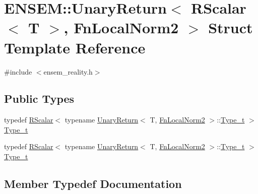 \hypertarget{structENSEM_1_1UnaryReturn_3_01RScalar_3_01T_01_4_00_01FnLocalNorm2_01_4}{}\section{E\+N\+S\+EM\+:\+:Unary\+Return$<$ R\+Scalar$<$ T $>$, Fn\+Local\+Norm2 $>$ Struct Template Reference}
\label{structENSEM_1_1UnaryReturn_3_01RScalar_3_01T_01_4_00_01FnLocalNorm2_01_4}


{\ttfamily \#include $<$ensem\+\_\+reality.\+h$>$}

\subsection*{Public Types}
\begin{DoxyCompactItemize}
\item 
typedef \mbox{\hyperlink{classENSEM_1_1RScalar}{R\+Scalar}}$<$ typename \mbox{\hyperlink{structENSEM_1_1UnaryReturn}{Unary\+Return}}$<$ T, \mbox{\hyperlink{structENSEM_1_1FnLocalNorm2}{Fn\+Local\+Norm2}} $>$\+::\mbox{\hyperlink{structENSEM_1_1UnaryReturn_3_01RScalar_3_01T_01_4_00_01FnLocalNorm2_01_4_ab989f2d45f35f7fcfa14b6b5f12d66f4}{Type\+\_\+t}} $>$ \mbox{\hyperlink{structENSEM_1_1UnaryReturn_3_01RScalar_3_01T_01_4_00_01FnLocalNorm2_01_4_ab989f2d45f35f7fcfa14b6b5f12d66f4}{Type\+\_\+t}}
\item 
typedef \mbox{\hyperlink{classENSEM_1_1RScalar}{R\+Scalar}}$<$ typename \mbox{\hyperlink{structENSEM_1_1UnaryReturn}{Unary\+Return}}$<$ T, \mbox{\hyperlink{structENSEM_1_1FnLocalNorm2}{Fn\+Local\+Norm2}} $>$\+::\mbox{\hyperlink{structENSEM_1_1UnaryReturn_3_01RScalar_3_01T_01_4_00_01FnLocalNorm2_01_4_ab989f2d45f35f7fcfa14b6b5f12d66f4}{Type\+\_\+t}} $>$ \mbox{\hyperlink{structENSEM_1_1UnaryReturn_3_01RScalar_3_01T_01_4_00_01FnLocalNorm2_01_4_ab989f2d45f35f7fcfa14b6b5f12d66f4}{Type\+\_\+t}}
\end{DoxyCompactItemize}


\subsection{Member Typedef Documentation}
\mbox{\label{structENSEM_1_1UnaryReturn_3_01RScalar_3_01T_01_4_00_01FnLocalNorm2_01_4_ab989f2d45f35f7fcfa14b6b5f12d66f4}} 
